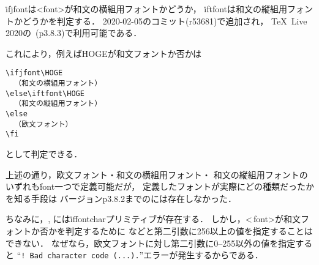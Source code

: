 \documentclass[a4paper,11pt,nomag,dvipdfmx]{jsarticle}
\begin{document}
\begin{cslist}
  \.{ifjfont}は<font>が和文の横組用フォントかどうか，
  \.{iftfont}は和文の縦組用フォントかどうかを判定する．
  2020-02-05のコミット(r53681)で追加され，
  \TeX~Live 2020の\pTeX~(p3.8.3)で利用可能である．

  これにより，例えば\.{HOGE}が和文フォントか否かは
\begin{verbatim}
\ifjfont\HOGE
  （和文の横組用フォント）
\else\iftfont\HOGE
  （和文の縦組用フォント）
\else
  （欧文フォント）
\fi
\end{verbatim}
  として判定できる．
\end{cslist}

\begin{dangerous}
  上述の通り，欧文フォント・和文の横組用フォント・
  和文の縦組用フォントのいずれも\.{font}一つで定義可能だが，
  定義したフォントが実際にどの種類だったかを知る手段は
  バージョンp3.8.2までの\pTeX には存在しなかった．
\end{dangerous}

\begin{dangerous}
  ちなみに，\epTeX, \eupTeX には\.{iffontchar}プリミティブが存在する．
  しかし，<\,font>が和文フォントか否かを判定するために
  などと第二引数に256以上の値を指定することはできない．
  なぜなら，欧文フォントに対し第二引数に0--255以外の値を指定すると
  ``\verb|! Bad character code (...).|''エラーが発生するからである．
\end{dangerous}
\end{document}

